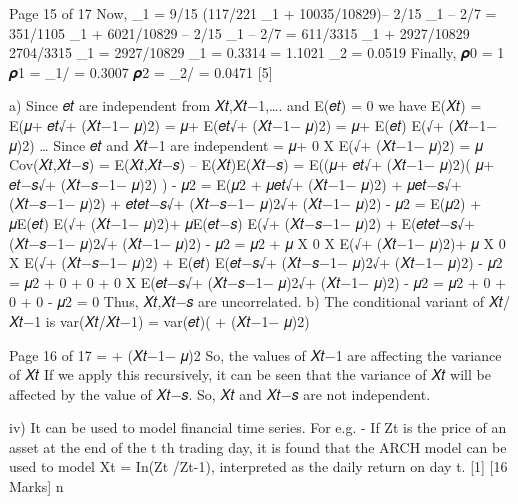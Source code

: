 Page 15 of 17
Now,
\gamma_{1} = 9/15 (117/221 \gamma_{1} + 10035/10829)– 2/15 \gamma_{1} – 2/7
= 351/1105 \gamma_{1} + 6021/10829 – 2/15 \gamma_{1} – 2/7
= 611/3315 \gamma_{1} + 2927/10829
2704/3315 \gamma_{1} = 2927/10829
\gamma_{1} = 0.3314
 = 1.1021
\gamma_{2} = 0.0519
Finally,
𝝆0 = 1
𝝆1 = \gamma_{1}/ 
= 0.3007
𝝆2 = \gamma_{2}/ 
= 0.0471
[5]
\item
a) Since 𝑒𝑡 are independent from 𝑋𝑡,𝑋𝑡−1,…. and E(𝑒𝑡) = 0 we have
E(𝑋𝑡) = E(𝜇+ 𝑒𝑡√+ (𝑋𝑡−1− 𝜇)2)
= 𝜇+ E(𝑒𝑡√+ (𝑋𝑡−1− 𝜇)2)
= 𝜇+ E(𝑒𝑡) E(√+ (𝑋𝑡−1− 𝜇)2) … Since 𝑒𝑡 and 𝑋𝑡−1 are independent
= 𝜇+ 0 X E(√+ (𝑋𝑡−1− 𝜇)2)
= 𝜇
Cov(𝑋𝑡,𝑋𝑡−𝑠) = E(𝑋𝑡,𝑋𝑡−𝑠) – E(𝑋𝑡)E(𝑋𝑡−𝑠)
= E((𝜇+ 𝑒𝑡√+ (𝑋𝑡−1− 𝜇)2)( 𝜇+ 𝑒𝑡−𝑠√+ (𝑋𝑡−𝑠−1− 𝜇)2) ) - 𝜇2
= E(𝜇2 + 𝜇𝑒𝑡√+ (𝑋𝑡−1− 𝜇)2) + 𝜇𝑒𝑡−𝑠√+ (𝑋𝑡−𝑠−1− 𝜇)2) + 𝑒𝑡𝑒𝑡−𝑠√+ (𝑋𝑡−𝑠−1− 𝜇)2√+ (𝑋𝑡−1− 𝜇)2) - 𝜇2
= E(𝜇2) + 𝜇E(𝑒𝑡) E(√+ (𝑋𝑡−1− 𝜇)2)+ 𝜇E(𝑒𝑡−𝑠) E(√+ (𝑋𝑡−𝑠−1− 𝜇)2) + E(𝑒𝑡𝑒𝑡−𝑠√+ (𝑋𝑡−𝑠−1− 𝜇)2√+ (𝑋𝑡−1− 𝜇)2) - 𝜇2
= 𝜇2 + 𝜇 X 0 X E(√+ (𝑋𝑡−1− 𝜇)2)+ 𝜇 X 0 X E(√+ (𝑋𝑡−𝑠−1− 𝜇)2) + E(𝑒𝑡) E(𝑒𝑡−𝑠√+ (𝑋𝑡−𝑠−1− 𝜇)2√+ (𝑋𝑡−1− 𝜇)2) - 𝜇2
= 𝜇2 + 0 + 0 + 0 X E(𝑒𝑡−𝑠√+ (𝑋𝑡−𝑠−1− 𝜇)2√+ (𝑋𝑡−1− 𝜇)2) - 𝜇2
= 𝜇2 + 0 + 0 + 0 - 𝜇2
= 0
Thus, 𝑋𝑡,𝑋𝑡−𝑠 are uncorrelated.
b) The conditional variant of 𝑋𝑡/𝑋𝑡−1 is
var(𝑋𝑡/𝑋𝑡−1) = var(𝑒𝑡)( + (𝑋𝑡−1− 𝜇)2)


Page 16 of 17
= + (𝑋𝑡−1− 𝜇)2
So, the values of 𝑋𝑡−1 are affecting the variance of 𝑋𝑡
If we apply this recursively, it can be seen that the variance of 𝑋𝑡 will be affected by the value of 𝑋𝑡−𝑠.
So, 𝑋𝑡 and 𝑋𝑡−𝑠 are not independent.

iv)
It can be used to model financial time series.
For e.g. - If Zt is the price of an asset at the end of the t th trading day, it is found that the ARCH model can be used to model Xt = In(Zt /Zt-1), interpreted as the daily return on day t.
[1]
[16 Marks]
n